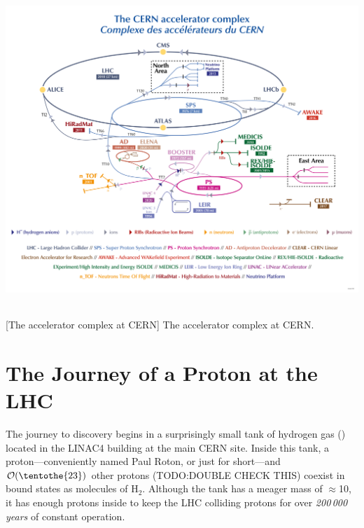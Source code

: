 \begin{multiFigure}
    \centering
    \includegraphics[height=12.5cm]{figures/lhc/cern_complex.png}
        [The accelerator complex at CERN]
        {The accelerator complex at CERN.}
    \label{fig:lhc_complex}
\end{multiFigure}

\section{The Journey of a Proton at the LHC}
The journey to discovery begins in a surprisingly small tank of hydrogen gas (\htwo) located in the LINAC4 building at the main CERN site.
Inside this tank, a proton---conveniently named Paul Roton, or just \pname for short---and $\mathcal{O}(\tentothe{23})$ other protons (TODO:DOUBLE CHECK THIS)
coexist in bound states as molecules of H$_2$.
Although the tank has a meager mass of 
$\approx$10\Kg,
it has enough protons inside to keep the LHC colliding protons for over \emph{200\,000 years} of constant operation.

